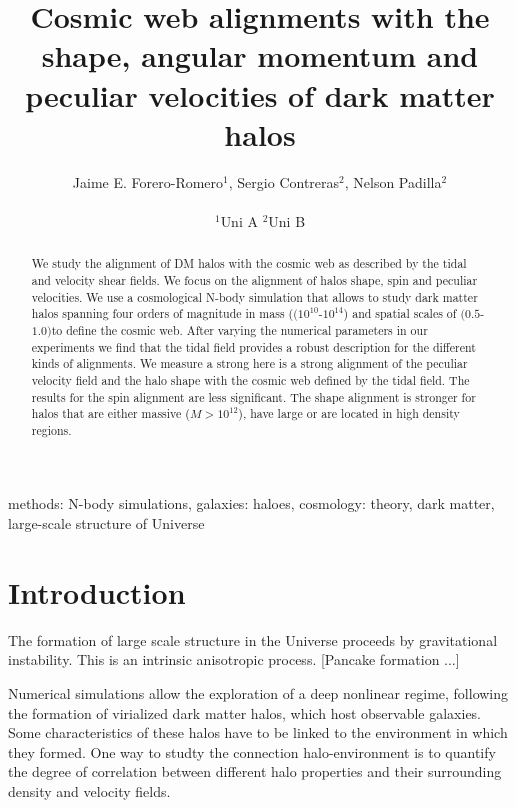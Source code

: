 \documentclass[useAMS,usenatbib]{mn2e}
\newcommand{\hMpc}{{\ifmmode{h^{-1}{\rm Mpc}}\else{$h^{-1}$Mpc }\fi}}
\newcommand{\hMsun}{{\ifmmode{h^{-1}{\rm
        {M_{\odot}}}}\else{$h^{-1}{\rm{M_{\odot}}}$}\fi}}
\begin{document}
\title[Cosmic web alignments with halos]{Cosmic web alignments with the shape, angular momentum and peculiar velocities of dark matter halos}  
\author[J.E. Forero-Romero et al.]{
\parbox[t]{\textwidth}{\raggedright 
  Jaime E. Forero-Romero$^{1}$,
  Sergio Contreras$^{2}$,
  Nelson Padilla$^{2}$ 
}
\vspace*{6pt}\\
$^{1}$Uni A
$^{2}$Uni B
}
\maketitle

\begin{abstract}

We study
the alignment of DM halos with the cosmic web as described by the
tidal and velocity shear fields. We focus on the alignment of halos
shape, spin and peculiar velocities. We use a cosmological N-body
simulation that allows to study dark matter halos spanning four orders
of magnitude in mass ($(10^{10}$-$10^{14}$) \hMsun and spatial
scales of $(0.5$-$1.0)$\hMpc to define the cosmic web. After varying
the numerical parameters in our experiments we find that the tidal
field provides a robust description for the different kinds of
alignments.  We measure a strong here is a strong alignment of the
peculiar velocity field and the halo shape with the cosmic web defined
by the tidal field. The results for the spin alignment are less
significant. The shape alignment is stronger for halos that are either
 massive ($M>10^{12}$\hMsun), have large or are located in high
 density regions.  


\end{abstract}
\begin{keywords}
methods: N-body simulations, galaxies: haloes, cosmology: theory, dark
matter, large-scale structure of Universe 
\end{keywords}


\section{Introduction}
\label{sec:introduction}

The formation of large scale structure in the Universe proceeds by
gravitational instability. This is an intrinsic anisotropic
process. [Pancake formation ...] 


Numerical simulations allow the exploration of a deep nonlinear
regime, following the formation of virialized dark matter halos, which
host observable galaxies. Some characteristics of these halos have to
be linked to the environment in which they formed. One way to studty
the connection halo-environment is to quantify the degree of
correlation between different halo properties and their surrounding
density and velocity fields. 
\end{document}
